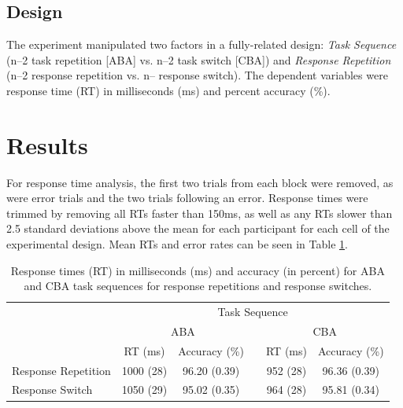 \documentclass[a4paper, doc, natbib]{apa6}
\begin{document}
\subsection{Design}
The experiment manipulated two factors in a fully-related design: \emph{Task Sequence} (n--2 task repetition [ABA] vs. n--2 task switch [CBA]) and \emph{Response Repetition} (n--2 response repetition vs. n-- response switch). The dependent variables were response time (RT) in milliseconds (ms) and percent accuracy (\%).


\section{Results}
For response time analysis, the first two trials from each block were removed, as were error trials and the two trials following an error. Response times were trimmed by removing all RTs faster than 150ms, as well as any RTs slower than 2.5 standard deviations above the mean for each participant for each cell of the experimental design. Mean RTs and error rates can be seen in Table \ref{tab:behaviouralData}.

\begin{table}[htbp]
\centering
\caption{Response times (RT) in milliseconds (ms) and accuracy (in percent) for ABA and CBA task sequences for response repetitions and response switches.}
\label{my-label}
\begin{tabular}{lccccc}
\hline
                    & \multicolumn{5}{c}{Task Sequence}                       \\ \cline{2-6} 
                    & \multicolumn{2}{c}{ABA}   &  & \multicolumn{2}{c}{CBA}  \\ \cline{2-3} \cline{5-6} 
                    & RT (ms)   & Accuracy (\%) &  & RT (ms)  & Accuracy (\%) \\ \hline
Response Repetition & 1000 (28) & 96.20 (0.39)  &  & 952 (28) & 96.36 (0.39) \\
Response Switch     & 1050 (29) & 95.02 (0.35)  &  & 964 (28) & 95.81 (0.34) \\ \hline
\end{tabular}
\label{tab:behaviouralData}
\end{table}
\end{document}
